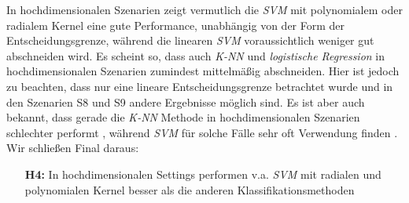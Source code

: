 \documentclass[
]{article}
\begin{document}
In hochdimensionalen Szenarien zeigt vermutlich die \textit{SVM} mit
polynomialem oder radialem Kernel eine gute Performance, unabhängig von
der Form der Entscheidungsgrenze, während die linearen \textit{SVM}
voraussichtlich weniger gut abschneiden wird. Es scheint so, dass auch
\textit{K-NN} und \textit{logistische Regression} in hochdimensionalen
Szenarien zumindest mittelmäßig abschneiden. Hier ist jedoch zu
beachten, dass nur eine lineare Entscheidungsgrenze betrachtet wurde und
in den Szenarien S8 und S9 andere Ergebnisse möglich sind. Es ist aber
auch bekannt, dass gerade die \textit{K-NN} Methode in hochdimensionalen
Szenarien schlechter performt
\parencite{jamesIntroductionStatisticalLearning2021}, während
\textit{SVM} für solche Fälle sehr oft Verwendung finden
\parencite{moguerzaSupportVectorMachines2006}. Wir schließen Final
daraus:

\begin{minipage}{0.9\linewidth}
\begin{itemize}[leftmargin=0.1\linewidth]
\item[\textbf{H4:}] In hochdimensionalen Settings performen v.a. \textit{SVM} mit radialen und polynomialen Kernel besser als die anderen Klassifikationsmethoden
\end{itemize}
\end{minipage}

\printbibliography
\end{document}
